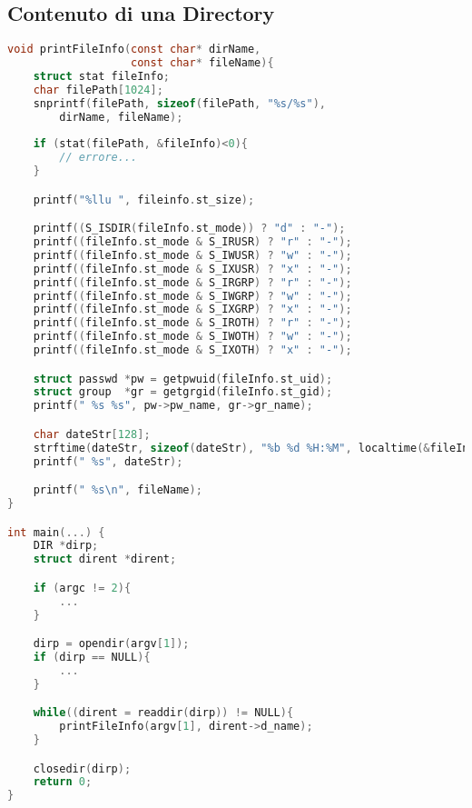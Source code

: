 \subsection{Contenuto di una Directory}
\begin{lstlisting}[language=c]
void printFileInfo(const char* dirName, 
                   const char* fileName){
    struct stat fileInfo;
    char filePath[1024];
    snprintf(filePath, sizeof(filePath, "%s/%s"), 
        dirName, fileName);
    
    if (stat(filePath, &fileInfo)<0){
        // errore...
    }

    printf("%llu ", fileinfo.st_size);

    printf((S_ISDIR(fileInfo.st_mode)) ? "d" : "-");
    printf((fileInfo.st_mode & S_IRUSR) ? "r" : "-");
    printf((fileInfo.st_mode & S_IWUSR) ? "w" : "-");
    printf((fileInfo.st_mode & S_IXUSR) ? "x" : "-");
    printf((fileInfo.st_mode & S_IRGRP) ? "r" : "-");
    printf((fileInfo.st_mode & S_IWGRP) ? "w" : "-");
    printf((fileInfo.st_mode & S_IXGRP) ? "x" : "-");
    printf((fileInfo.st_mode & S_IROTH) ? "r" : "-");
    printf((fileInfo.st_mode & S_IWOTH) ? "w" : "-");
    printf((fileInfo.st_mode & S_IXOTH) ? "x" : "-");

    struct passwd *pw = getpwuid(fileInfo.st_uid);
    struct group  *gr = getgrgid(fileInfo.st_gid);
    printf(" %s %s", pw->pw_name, gr->gr_name);

    char dateStr[128];
    strftime(dateStr, sizeof(dateStr), "%b %d %H:%M", localtime(&fileInfo.st_mtime));
    printf(" %s", dateStr);

    printf(" %s\n", fileName);
}

int main(...) {
    DIR *dirp;
    struct dirent *dirent;

    if (argc != 2){
        ...
    }

    dirp = opendir(argv[1]);
    if (dirp == NULL){
        ...
    }

    while((dirent = readdir(dirp)) != NULL){
        printFileInfo(argv[1], dirent->d_name);
    }

    closedir(dirp);
    return 0;
}
\end{lstlisting}
